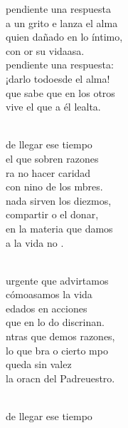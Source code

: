 \begin{cancion}%
	 pendiente una respuesta \\
	a un grito e lanza el alma\\
	quien dañado en lo íntimo, \\
	con or su vidaasa.\\
	 pendiente una respuesta: \\
	¡darlo todoesde el alma!\\
	que sabe que en los otros \\
	vive el  que a él lealta.\\\jump\\
	\begin{chorus}%
	de llegar ese tiempo \\
	el que sobren razones\\
	ra no hacer caridad \\
	con nino de los mbres.\\
	nada sirven los diezmos,\\
	compartir o el donar,\\
	 en la materia que damos\\
	a la vida no .   \\
	\end{chorus}%
	\jump\\
	urgente que advirtamos \\
	cómoasamos la vida\\
	edados en acciones \\
	que en lo do discrinan.\\
	ntras que demos razones, \\
	lo que bra o cierto mpo\\
	queda sin valez \\
	la oracn del Padreuestro.\\\jump\\
	\begin{chorus}%
	de llegar ese tiempo \\

\end{chorus}
\end{cancion}
